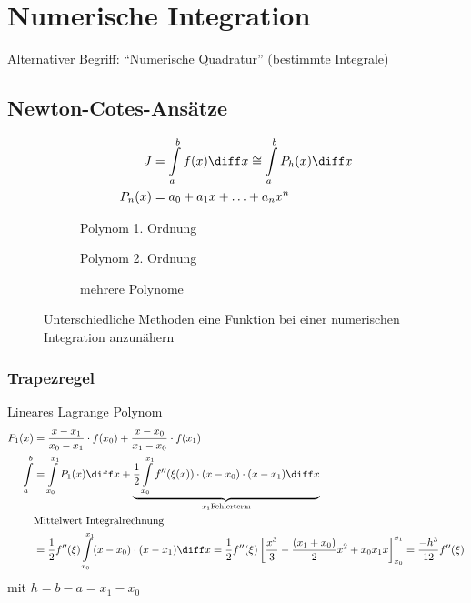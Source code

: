 \section{Numerische Integration}
Alternativer Begriff: "`Numerische Quadratur"' (bestimmte Integrale)

\subsection{Newton-Cotes-Ansätze}
\begin{equation}
\begin{split}
J &= \int\limits_a^bf(x)\diff x \cong\int\limits_a^bP_h(x)\diff x\\
P_n(x) &= a_0 + a_1x + \ldots + a_nx^n
\end{split}
\end{equation}

\begin{figure}
	\center
	\begin{subfigure}{0.3\textwidth}
		
		\caption{Polynom 1. Ordnung}
	\end{subfigure}
	\begin{subfigure}{0.3\textwidth}
		
		\caption{Polynom 2. Ordnung}
	\end{subfigure}
	\begin{subfigure}{0.3\textwidth}
		
		\caption{mehrere Polynome}
	\end{subfigure}
	\caption{Unterschiedliche Methoden eine Funktion bei einer numerischen Integration anzunähern}
\end{figure}

\subsubsection{Trapezregel}
Lineares Lagrange Polynom
\begin{equation}
\begin{split}
P_1(x) &= \frac{x-x_1}{x_0-x_1}\cdot f(x_0) + \frac{x-x_0}{x_1-x_0}\cdot f(x_1)\\
\int\limits_a^b &= \int\limits_{x_0}^{x_1}P_1(x)\diff x + \underbrace{\frac{1}{2}\int\limits_{x_0}^{x_1}f''(\xi(x))\cdot (x-x_0)\cdot (x-x_1)\diff x}_{x_1 \text{Fehlerterm}}\\
 & \text{Mittelwert Integralrechnung}\\
 &= \frac{1}{2}f''(\xi)\int\limits_{x_0}^{x_1}(x-x_0)\cdot (x-x_1)\diff x = \frac{1}{2}f''(\xi)\left[\frac{x^3}{3}-\frac{(x_1+x_0)}{2}x^2+x_0x_1x\right]_{x_0}^{x_1} = \frac{-h^3}{12}f''(\xi)
\end{split}
\end{equation}
mit $h = b-a = x_1-x_0$

